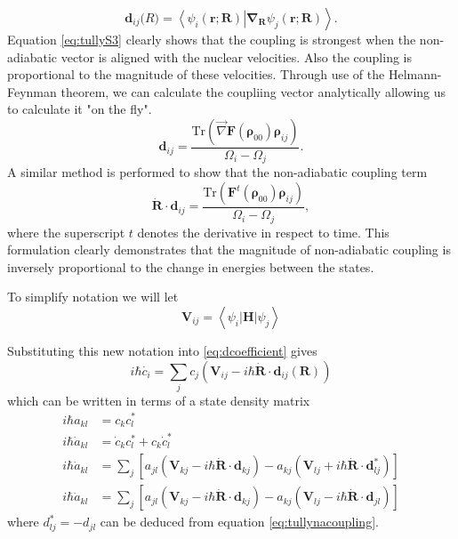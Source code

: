           \begin{equation} \label{eq:tullynacoupling} 
            \mathbf{d}_{ij}\mathbf(R) =
            \left<\psi_{i}(\mathbf{r};\mathbf{R})\right|\mathbf{\nabla}_{\mathbf{R}}\left.\psi_j(\mathbf{r};\mathbf{R})\right>.
          \end{equation}
          Equation \ref{eq:tullyS3} clearly shows that the coupling is strongest when the non-adiabatic vector is aligned with the nuclear velocities.
          Also the coupling is proportional to the magnitude of these velocities.
          Through use of the Helmann-Feynman theorem, we can calculate the coupliing vector analytically allowing us to calculate it "on the fly". \cite{chernyak2000density,tommasini2001electronic,tretiak1996collective,tretiak2009representation,Tretiak1996,Tretiak1999}
          \begin{equation}\label{NACouplingAnalytic}
            \mathbf{d}_{ij} = \frac{\text{Tr}(\vec{\nabla}\mathbf{F}(\bm{\rho}_{00})\bm{\rho}_{ij})}
                   {\Omega_i - \Omega_j}.
          \end{equation}
     A similar method is performed to show that the non-adiabatic coupling term
\begin{equation}\label{eq:NACouplingTerm}
\dot{\mathbf{R}} \cdot \mathbf{d}_{ij} = \frac{\text{Tr}(\mathbf{F}^t(\bm{\rho}_{00}) \bm{\rho}_{ij})}{\Omega_i - \Omega_j},
\end{equation}
where the superscript \(t\) denotes the derivative in respect to time.
          This formulation clearly demonstrates that the magnitude of non-adiabatic coupling is inversely proportional to the change in energies between the states.

          To simplify notation we will let
          \begin{equation}
            \mathbf{V}_{ij} = \left< \psi_i | \mathbf{H} | \psi_j \right>
          \end{equation}

          Substituting this new notation into \ref{eq:dcoefficient} gives
          \begin{equation}
            i\hbar \dot{c_i} = \sum_j c_j \left(\mathbf{V}_{ij} - i\hbar \dot{\mathbf{R}}\cdot\mathbf{d}_{ij}(\mathbf{R}) \right)
          \end{equation}
          which can be written in terms of a state density matrix
          \begin{align}
            i\hbar a_{kl} &= c_k c_l^*\\
            i\hbar \dot{a}_{kl} &= \dot{c}_k c_l^* + c_k \dot{c}_l^* \\
            i\hbar \dot{a}_{kl} &= \sum_j \left[ a_{jl} (\mathbf{V}_{kj} - i\hbar \dot{\mathbf{R}} \cdot \mathbf{d}_{kj})
              - a_{kj} ( \mathbf{V}_{lj} + i\hbar \dot{\mathbf{R}} \cdot \mathbf{d}_{lj}^*) \right] \\
            i\hbar \dot{a}_{kl} &= \sum_j \left[ a_{jl} (\mathbf{V}_{kj} - i\hbar \dot{\mathbf{R}} \cdot \mathbf{d}_{kj})
              - a_{kj} ( \mathbf{V}_{lj} - i\hbar \dot{\mathbf{R}} \cdot \mathbf{d}_{jl}) \right]
          \end{align}
          where \(d_{lj}^* = -d_{jl}\) can be deduced from equation \ref{eq:tullynacoupling}.

